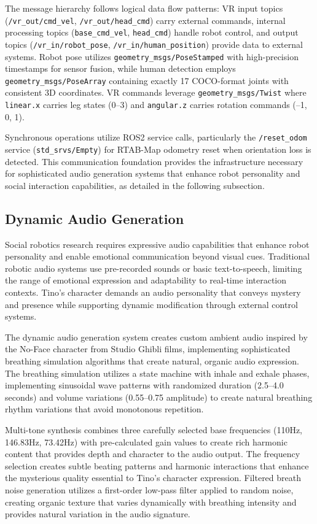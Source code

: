 The message hierarchy follows logical data flow patterns: VR input topics (\texttt{/vr\_out/cmd\_vel}, \texttt{/vr\_out/head\_cmd}) carry external commands, internal processing topics (\texttt{base\_cmd\_vel}, \texttt{head\_cmd}) handle robot control, and output topics (\texttt{/vr\_in/robot\_pose}, \texttt{/vr\_in/human\_position}) provide data to external systems. Robot pose utilizes \texttt{geometry\_msgs/PoseStamped} with high-precision timestamps for sensor fusion, while human detection employs \texttt{geometry\_msgs/PoseArray} containing exactly 17 COCO-format joints with consistent 3D coordinates. VR commands leverage \texttt{geometry\_msgs/Twist} where \texttt{linear.x} carries leg states (0--3) and \texttt{angular.z} carries rotation commands (--1, 0, 1).

Synchronous operations utilize ROS2 service calls, particularly the \texttt{/reset\_odom} service (\texttt{std\_srvs/Empty}) for RTAB-Map odometry reset when orientation loss is detected. This communication foundation provides the infrastructure necessary for sophisticated audio generation systems that enhance robot personality and social interaction capabilities, as detailed in the following subsection.

\subsection{Dynamic Audio Generation}

Social robotics research requires expressive audio capabilities that enhance robot personality and enable emotional communication beyond visual cues. Traditional robotic audio systems use pre-recorded sounds or basic text-to-speech, limiting the range of emotional expression and adaptability to real-time interaction contexts. Tino's character demands an audio personality that conveys mystery and presence while supporting dynamic modification through external control systems.

The dynamic audio generation system creates custom ambient audio inspired by the No-Face character from Studio Ghibli films, implementing sophisticated breathing simulation algorithms that create natural, organic audio expression. The breathing simulation utilizes a state machine with inhale and exhale phases, implementing sinusoidal wave patterns with randomized duration (2.5--4.0 seconds) and volume variations (0.55--0.75 amplitude) to create natural breathing rhythm variations that avoid monotonous repetition.

Multi-tone synthesis combines three carefully selected base frequencies (110Hz, 146.83Hz, 73.42Hz) with pre-calculated gain values to create rich harmonic content that provides depth and character to the audio output. The frequency selection creates subtle beating patterns and harmonic interactions that enhance the mysterious quality essential to Tino's character expression. Filtered breath noise generation utilizes a first-order low-pass filter applied to random noise, creating organic texture that varies dynamically with breathing intensity and provides natural variation in the audio signature.

